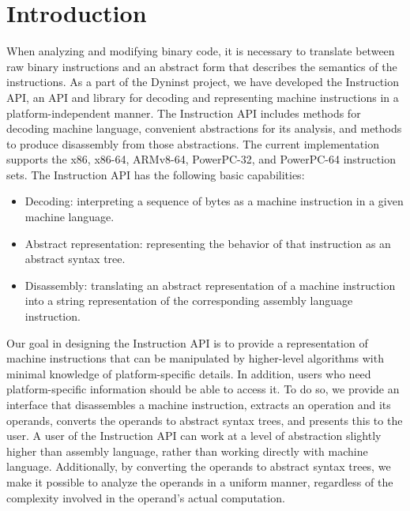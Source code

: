 \section{Introduction}
\label{sec:intro}

When analyzing and modifying binary code, it is necessary to translate between
raw binary instructions and an abstract form that describes the semantics of the
instructions. As a part of the Dyninst project, we have developed the
Instruction API, an API and library for decoding and representing machine
instructions in a platform-\/independent manner. The Instruction API includes
methods for decoding machine language, convenient abstractions for its analysis,
and methods to produce disassembly from those abstractions. The current
implementation supports the x86, x86-64, ARMv8-64, PowerPC-32, and PowerPC-64 instruction sets.
The Instruction API has the following basic capabilities:

\begin{itemize}
\item Decoding: interpreting a sequence of bytes as a machine instruction in a given machine language.
\item Abstract representation: representing the behavior of that instruction as an abstract syntax tree.
\item Disassembly: translating an abstract representation of a machine instruction into a string representation of the corresponding assembly language instruction.
\end{itemize}

Our goal in designing the Instruction API is to provide a representation of
machine instructions that can be manipulated by higher-\/level algorithms with
minimal knowledge of platform-\/specific details. In addition, users who need
platform-\/specific information should be able to access it. To do so, we
provide an interface that disassembles a machine instruction, extracts an
operation and its operands, converts the operands to abstract syntax trees, and
presents this to the user. A user of the Instruction API can work at a level of
abstraction slightly higher than assembly language, rather than working directly
with machine language. Additionally, by converting the operands to abstract
syntax trees, we make it possible to analyze the operands in a uniform manner,
regardless of the complexity involved in the operand's actual computation.
